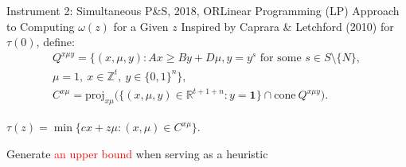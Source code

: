 \documentclass[14pt]{beamer}
\newcommand{\R}{\mathbb{R}}
\newcommand{\Z}{\mathbb{Z}}
\begin{document}
\begin{frame}{Instrument 2: Simultaneous P\&S, {\footnotesize 2018, OR}}{Linear Programming (LP) Approach to Computing $\omega(z)$ for a Given $z$}
\small
Inspired by Caprara \& Letchford (2010) for $\tau(0)$, define:
{\small
\begin{eqnarray*}
Q^{x\mu y} = \big\{(x,\mu,y):Ax \geq By+D\mu, y = y^s\mbox{~for some $s \in S \setminus \{N\}$},\\
 \mu=1,~x \in \Z^{ t},~y \in \big\{0,1\big\}^{n}\big\},\\
 C^{x\mu} = \mathrm{proj}_{x\mu} \big( \big\{ (x,\mu,y) \in \R^{t+1+n}:  y = \mathbf{1} \big\} \cap \mathrm{cone~} Q^{x\mu y} \big).
\end{eqnarray*}
}
\vspace{-6mm}
\begin{theorem}
\centering
	$\tau(z)=\min \big\{ cx + z\mu: (x,\mu) \in C^{x\mu} \big\}$.
\end{theorem}
\begin{shaded}
\centering
Generate \textcolor{red}{an upper bound} when serving as a heuristic
\end{shaded}
\end{frame}
\end{document}
